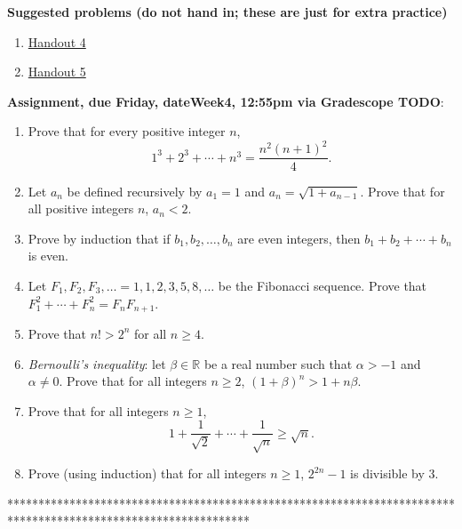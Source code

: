 \documentclass[12pt]{article}
\newcommand{\HWdueTime}{12:55pm }
\begin{document}
\noindent \textbf{Suggested problems (do not hand in; these are just for extra practice)}

\begin{enumerate}
\item \href{https://www.math.emory.edu/~dzb/teaching/250Fall2021/handouts/250-H04-induction-warmup.pdf}{Handout 4}
\item \href{https://www.math.emory.edu/~dzb/teaching/250Fall2021/handouts/250-H05-induction-problems.pdf}{Handout 5}
\end{enumerate}

\noindent \textbf{Assignment, due Friday, \csname dateWeek4\endcsname, \HWdueTime via Gradescope TODO}:
\begin{enumerate}
\item Prove that for every positive integer $n$,
 $$1^3 + 2^3 + \cdots +n^3 = \frac{n^2(n+1)^2}{4}.$$ 
\item Let $a_n$ be defined recursively by $a_1 = 1$ and $a_n = \sqrt{1 + a_{n-1}}$. Prove that for all positive integers $n$, $a_n < 2$.
\item Prove by induction that if $b_1, b_2, \ldots , b_n$ are even integers, then $b_1 + b_2 + \cdots + b_n$ is even.
 \item Let $F_1, F_2, F_3, \ldots = 1,1,2,3,5,8,\ldots$ be the Fibonacci sequence. Prove that $F_1^2 + \cdots + F_n^2 = F_nF_{n+1}$.
 \item Prove that $n! > 2^n$ for all $n \geq 4$.
 \item \emph{Bernoulli's inequality}: let $\beta \in \mathbb{R}$ be a real number such that $\alpha > -1$ and $\alpha \neq 0$. Prove that for all integers $n \geq 2$, $(1 + \beta)^n > 1 + n\beta$.
 \item Prove that for all integers $n \geq 1$,
   \[
1 + \frac{1}{\sqrt{2}} + \cdots + \frac{1}{\sqrt{n}} \geq \sqrt{n}.
     \]
   \item Prove (using induction) that for all integers $n \geq 1$, $2^{2n}-1$ is divisible by 3.
 \end{enumerate}


 
***************************************************************************************************************
\newpage
\end{document}
